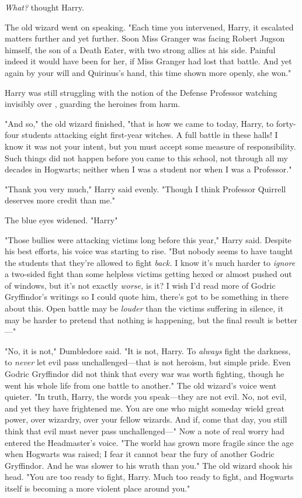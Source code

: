 \emph{What?} thought Harry.

The old wizard went on speaking. "Each time you intervened, Harry, it escalated
matters further and yet further. Soon Miss Granger was facing Robert Jugson
himself, the son of a Death Eater, with two strong allies at his side. Painful
indeed it would have been for her, if Miss Granger had lost that battle. And
yet again by your will and Quirinus's hand, this time shown more openly, she
won."

Harry was still struggling with the notion of the Defense Professor watching
invisibly over \SPHEW, guarding the heroines from harm.

"And so," the old wizard finished, "that is how we came to today, Harry, to
forty-four students attacking eight first-year witches. A full battle in these
halls! I know it was not your intent, but you must accept some measure of
responsibility. Such things did not happen before you came to this school, not
through all my decades in Hogwarts; neither when I was a student nor when I was
a Professor."

"Thank you very much," Harry said evenly. "Though I think Professor Quirrell
deserves more credit than me."

The blue eyes widened. "Harry{\el}"

"Those bullies were attacking victims long before this year," Harry said.
Despite his best efforts, his voice was starting to rise. "But nobody seems to
have taught the students that they're allowed to fight \emph{back.} I know it's
much harder to \emph{ignore} a two-sided fight than some helpless victims
getting hexed or almost pushed out of windows, but it's not exactly
\emph{worse,} is it? I wish I'd read more of Godric Gryffindor's writings so I
could quote him, there's got to be something in there about this. Open battle
may be \emph{louder} than the victims suffering in silence, it may be harder to
pretend that nothing is happening, but the final result is better—"

"No, it is not," Dumbledore said. "It is not, Harry. To \emph{always} fight the
darkness, to \emph{never} let evil pass unchallenged—that is not heroism, but
simple pride. Even Godric Gryffindor did not think that every war was worth
fighting, though he went his whole life from one battle to another." The old
wizard's voice went quieter. "In truth, Harry, the words you speak—they are
not evil. No, not evil, and yet they have frightened me. You are one who might
someday wield great power, over wizardry, over your fellow wizards. And if,
come that day, you still think that evil must never pass unchallenged—" Now a
note of real worry had entered the Headmaster's voice. "The world has grown
more fragile since the age when Hogwarts was raised; I fear it cannot bear the
fury of another Godric Gryffindor. And he was slower to his wrath than you."
The old wizard shook his head. "You are too ready to fight, Harry. Much too
ready to fight, and Hogwarts itself is becoming a more violent place around
you."

